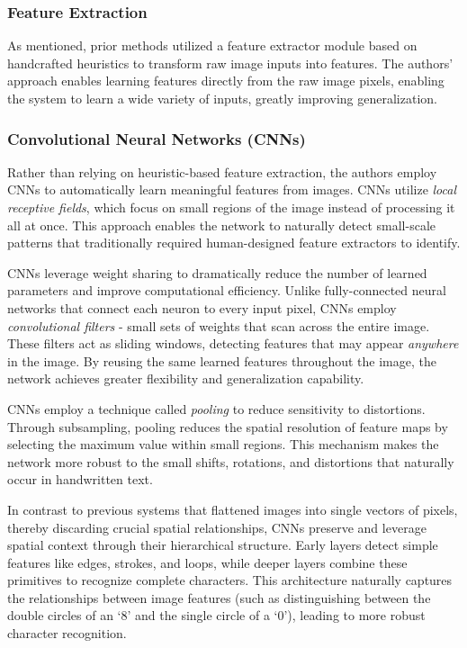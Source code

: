 \documentclass[10pt]{article}
\begin{document}
\subsubsection*{Feature Extraction}
As mentioned, prior methods utilized a feature extractor module based on handcrafted heuristics to transform raw image inputs into features. The authors' approach enables learning features directly from the raw image pixels, enabling the system to learn a wide variety of inputs, greatly improving generalization.

\subsubsection*{Convolutional Neural Networks (CNNs)}
Rather than relying on heuristic-based feature extraction, the authors employ CNNs to automatically learn meaningful features from images. CNNs utilize \textit{local receptive fields}, which focus on small regions of the image instead of processing it all at once. This approach enables the network to naturally detect small-scale patterns that traditionally required human-designed feature extractors to identify.

CNNs leverage weight sharing to dramatically reduce the number of learned parameters and improve computational efficiency. Unlike fully-connected neural networks that connect each neuron to every input pixel, CNNs employ \textit{convolutional filters} - small sets of weights that scan across the entire image. These filters act as sliding windows, detecting features that may appear \textit{anywhere} in the image. By reusing the same learned features throughout the image, the network achieves greater flexibility and generalization capability.


CNNs employ a technique called \textit{pooling} to reduce sensitivity to distortions. Through subsampling, pooling reduces the spatial resolution of feature maps by selecting the maximum value within small regions. This mechanism makes the network more robust to the small shifts, rotations, and distortions that naturally occur in handwritten text.

In contrast to previous systems that flattened images into single vectors of pixels, thereby discarding crucial spatial relationships, CNNs preserve and leverage spatial context through their hierarchical structure. Early layers detect simple features like edges, strokes, and loops, while deeper layers combine these primitives to recognize complete characters. This architecture naturally captures the relationships between image features (such as distinguishing between the double circles of an `8' and the single circle of a `0'), leading to more robust character recognition.
\end{document}
